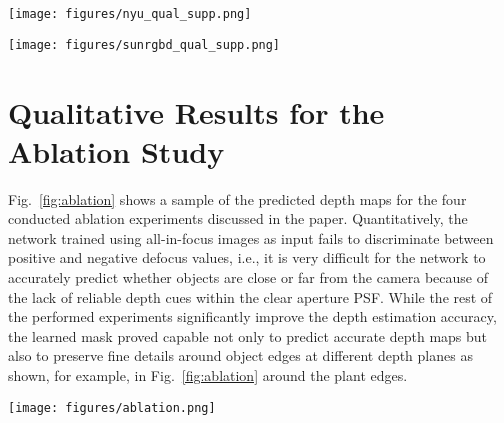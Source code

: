 \documentclass[preprint,5p,twocolumn]{elsarticle}
\begin{document}
\begin{figure*}[h!]
\centering
\texttt{[image: figures/nyu\_qual\_supp.png]}
\caption{Additional qualitative results from the proposed approach as well as those from AdaBins~\cite{bhat2020adabins} on the test set of NYUV2~\cite{eigen2015predicting}.}
\label{fig:supp_nyu}
\end{figure*}



\begin{figure*}[h!]
\centering
\texttt{[image: figures/sunrgbd\_qual\_supp.png]}
\caption{Additional qualitative results from our proposed method on the test set of SUNRGBD~\cite{song2015sun}}
\label{fig:supp_sunrgbd}
\end{figure*}

\section{Qualitative Results for the Ablation Study}
\label{sec:abl}

Fig.~\ref{fig:ablation} shows a sample of the predicted depth maps for the four conducted ablation experiments discussed in the paper. Quantitatively, the network trained using all-in-focus images as input fails to discriminate between positive and negative defocus values, i.e., it is very difficult for the network to accurately predict whether objects are close or far from the camera because of the  lack of reliable depth cues within the clear aperture PSF. While the rest of the performed experiments significantly improve the depth estimation accuracy, the learned mask proved capable not only to predict accurate depth maps but also to preserve  fine details around object edges at different depth planes as shown, for example, in Fig.~\ref{fig:ablation} around the plant edges.

\begin{figure*}[h!]
\begin{center}
\texttt{[image: figures/ablation.png]}
\end{center}
   \caption{A sample from the qualitative results for the four conducted ablation experiments on the test set of the subset of FlyingThings3D~\cite{MIFDB16}.}
\label{fig:ablation}
\end{figure*}


 
\end{document}
